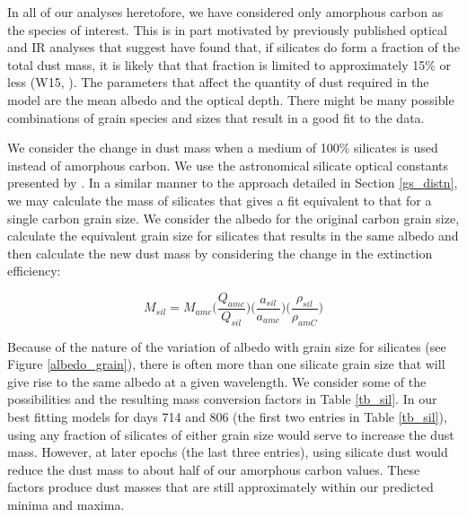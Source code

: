 \documentclass[useAMS,usenatbib,usegraphicx]{mnras}
\begin{document}
In all of our analyses heretofore, we have considered only amorphous carbon as the species of interest.  This is in part motivated by previously published optical and IR analyses that suggest have found that, if silicates do form a fraction of the total dust mass, it is likely that that fraction is limited to approximately 15\% or less (W15, \citet{Ercolano2007}).  The parameters that affect the quantity of dust required in the model are the mean albedo and the optical depth.  There might be many possible combinations of grain species and sizes that result in a good fit to the data.  

We consider the change in dust mass when a medium of 100\% silicates is used instead of amorphous carbon.  We use the astronomical silicate optical constants presented by \cite{Draine1984}.  In a similar manner to the approach detailed in Section \ref{gs_distn}, we may calculate the mass of silicates that gives a fit equivalent to that for a single carbon grain size.  We consider the albedo for the original carbon grain size, calculate the equivalent grain size for silicates that results in the same albedo and then calculate the new dust mass by considering the change in the extinction efficiency:

\begin{equation}
M_{sil} = M_{amc} \Big( \frac{Q_{amc}}{Q_{sil}} \Big) \Big(\frac{a_{sil}}{a_{amc}}\Big) \Big(\frac{\rho_{sil}}{\rho_{amC}}\Big)
\end{equation}

Because of the nature of the variation of albedo with grain size for silicates (see Figure \ref{albedo_grain}), there is often more than one silicate grain size that will give rise to the same albedo at a given wavelength.  We consider some of the possibilities and the resulting mass conversion factors in Table \ref{tb_sil}.  In our best fitting models for days 714 and 806 (the first two entries in Table \ref{tb_sil}), using any fraction of silicates of either grain size would serve to increase the dust mass.  However, at later epochs (the last three entries), using silicate dust would reduce the dust mass to about half of our amorphous carbon values. These factors produce dust masses that are still approximately within our predicted minima and maxima.
\end{document}
